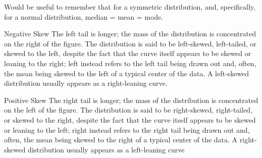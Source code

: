 \documentclass{article}
\begin{document}
Would be useful to remember that for a symmetric distribution, and, specifically, for a normal distribution, median = mean = mode.

Negative Skew
The left tail is longer; the mass of the distribution is concentrated on the right of the figure. The distribution is said to be left-skewed, left-tailed, or skewed to the left, despite the fact that the curve itself appears to be skewed or leaning to the right; left instead refers to the left tail being drawn out and, often, the mean being skewed to the left of a typical center of the data. A left-skewed distribution usually appears as a right-leaning curve.

Positive Skew
The right tail is longer; the mass of the distribution is concentrated on the left of the figure. The distribution is said to be right-skewed, right-tailed, or skewed to the right, despite the fact that the curve itself appears to be skewed or leaning to the left; right instead refers to the right tail being drawn out and, often, the mean being skewed to the right of a typical center of the data. A right-skewed distribution usually appears as a left-leaning curve
\end{document}
